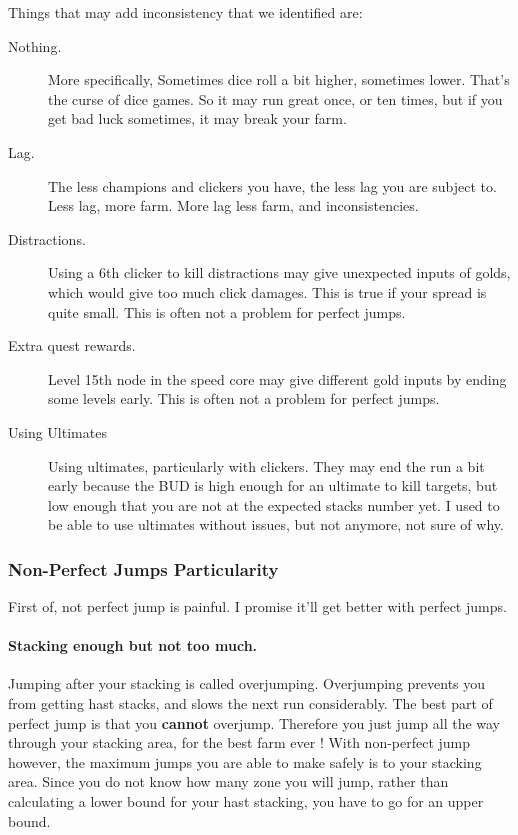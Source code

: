 \documentclass{article}
\begin{document}
Things that may add inconsistency that we identified are:
\begin{description}
    \item[Nothing.] 
    More specifically, 
    Sometimes dice roll a bit higher, sometimes lower.
    That's the curse of dice games.
    So it may run great once, or ten times, but if you get bad luck sometimes, it may break your farm.
    
    \item[Lag.]
    The less champions and clickers you have, the less lag you are subject to.
    Less lag, more farm.
    More lag less farm, and inconsistencies.
    
    \item[Distractions.] 
    Using a 6th clicker to kill distractions may give unexpected inputs of golds, which would give too much click damages.
    This is true if your spread is quite small.
    This is often not a problem for perfect jumps.
    
    \item[Extra quest rewards.] 
    Level 15th node in the speed core may give different gold inputs by ending some levels early.
    This is often not a problem for perfect jumps.
    
    \item[Using Ultimates] 
    Using ultimates, particularly with clickers.
    They may end the run a bit early because the BUD is high enough for an ultimate to kill targets, but low enough that you are not at the expected stacks number yet.
    I used to be able to use ultimates without issues, but not anymore, not sure of why.
\end{description}


\subsubsection{Non-Perfect Jumps Particularity}
\label{sec:nonPerfectJumps}

First of, not perfect jump is painful.\newline
I promise it'll get better with perfect jumps.

\paragraph{Stacking enough but not too much.}
Jumping after your stacking is called overjumping.
Overjumping prevents you from getting hast stacks, and slows the next run considerably.
The best part of perfect jump is that you \textbf{cannot} overjump.
Therefore you just jump all the way through your stacking area, for the best farm ever !
With non-perfect jump however, the maximum jumps you are able to make safely is to your stacking area.
Since you do not know how many zone you will jump, rather than calculating a lower bound for your hast stacking, you have to go for an upper bound.
\end{document}
